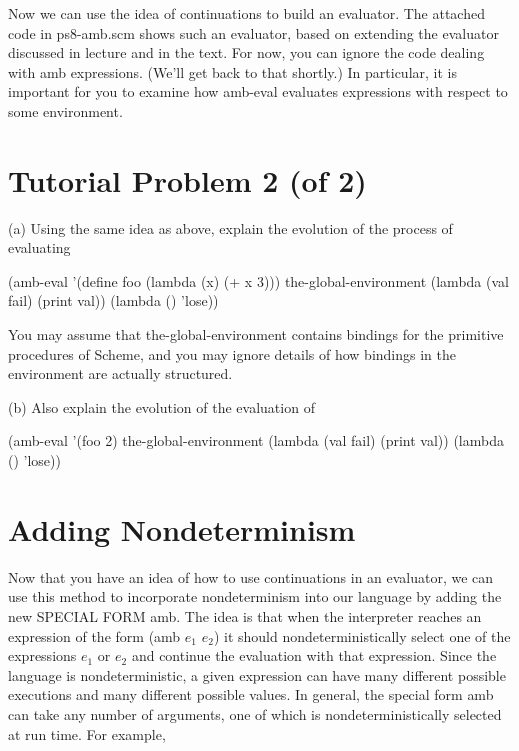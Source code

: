 Now we can use the idea of continuations to build an evaluator.  The
attached code in {\cf ps8-amb.scm} shows such an evaluator, based
on extending the evaluator discussed in lecture and in the text.  For
now, you can ignore the code dealing with {\cf amb} expressions. (We'll
get back to that shortly.)  In particular, it is important for you to
examine how {\cf amb-eval} evaluates expressions with respect to some
environment.

\section{Tutorial Problem 2 (of 2)}

(a) Using the same idea as above, explain the evolution of the process of
evaluating

\beginlisp
(amb-eval '(define foo (lambda (x) (+ x 3)))
          the-global-environment
          (lambda (val fail) (print val))
          (lambda () 'lose))
\endlisp

You may assume that {\cf the-global-environment} contains bindings for
the primitive procedures of {\sc Scheme}, and you may ignore details of how
bindings in the environment are actually structured.

(b) Also explain the evolution of the evaluation of

\beginlisp
(amb-eval '(foo 2)
          the-global-environment
          (lambda (val fail) (print val))
          (lambda () 'lose))
\endlisp

\vskip 10pt


\section{Adding Nondeterminism}

Now that you have an idea of how to use continuations in an evaluator,
we can use this method to incorporate nondeterminism into our language
by adding the new SPECIAL FORM {\cf amb}.
The idea is that when the interpreter reaches an expression of the form
{\cf (amb $e_1$ $e_2$)}
it should nondeterministically select one of the expressions $e_1$ or $e_2$ and
continue
the evaluation with that expression.  Since the language is nondeterministic,
a given expression can have many different possible executions and many
different possible values.  In general, the special form
{\cf amb} can take any number of arguments, one of which is
nondeterministically selected at run time.  For example,

